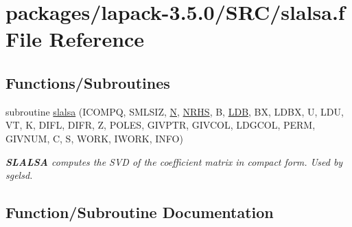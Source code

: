 \hypertarget{slalsa_8f}{}\section{packages/lapack-\/3.5.0/\+S\+R\+C/slalsa.f File Reference}
\label{slalsa_8f}
\subsection*{Functions/\+Subroutines}
\begin{DoxyCompactItemize}
\item 
subroutine \hyperlink{slalsa_8f_adbe5eb425046a673b19098e937b82819}{slalsa} (I\+C\+O\+M\+P\+Q, S\+M\+L\+S\+I\+Z, \hyperlink{polmisc_8c_a0240ac851181b84ac374872dc5434ee4}{N}, \hyperlink{example__user_8c_aa0138da002ce2a90360df2f521eb3198}{N\+R\+H\+S}, B, \hyperlink{example__user_8c_a50e90a7104df172b5a89a06c47fcca04}{L\+D\+B}, B\+X, L\+D\+B\+X, U, L\+D\+U, V\+T, K, D\+I\+F\+L, D\+I\+F\+R, Z, P\+O\+L\+E\+S, G\+I\+V\+P\+T\+R, G\+I\+V\+C\+O\+L, L\+D\+G\+C\+O\+L, P\+E\+R\+M, G\+I\+V\+N\+U\+M, C, S, W\+O\+R\+K, I\+W\+O\+R\+K, I\+N\+F\+O)
\begin{DoxyCompactList}\small\item\em {\bfseries S\+L\+A\+L\+S\+A} computes the S\+V\+D of the coefficient matrix in compact form. Used by sgelsd. \end{DoxyCompactList}\end{DoxyCompactItemize}


\subsection{Function/\+Subroutine Documentation}
\hypertarget{slalsa_8f_adbe5eb425046a673b19098e937b82819}{}
